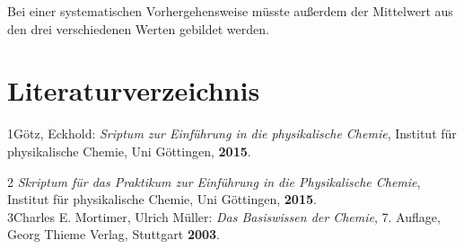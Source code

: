 \documentclass[12pt,a4paper,titlepage,headinclude,bibtotoc]{scrartcl}
\begin{document}
Bei einer systematischen Vorhergehensweise müsste außerdem der Mittelwert aus den drei verschiedenen Werten gebildet werden.\\

\newpage

\section{Literaturverzeichnis}
1\quad Götz, Eckhold: \emph{Sriptum zur Einführung in die physikalische Chemie}, Institut für physikalische Chemie, Uni Göttingen, \textbf{2015}.

\vspace{0,5 cm}

2 \quad \emph{Skriptum für das Praktikum zur Einführung in die Physikalische Chemie}, Institut für physikalische Chemie, Uni Göttingen, \textbf{2015}.\\

3\quad Charles E. Mortimer, Ulrich Müller: \emph{Das Basiswissen der Chemie}, 7. Auflage, Georg Thieme Verlag, Stuttgart \textbf{2003}.
\end{document}
